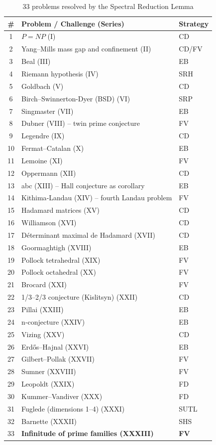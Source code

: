 \documentclass[11pt,a4paper]{article}
\begin{document}
\begin{center}
\small
\begin{longtable}{@{}cll@{}}
\caption{33 problems resolved by the Spectral Reduction Lemma}\\
\toprule
\# & Problem / Challenge (Series) & Strategy \\
\midrule
1 & \(P = NP\) (I) & CD \\
2 & Yang–Mills mass gap and confinement (II) & CD/FV \\
3 & Beal (III) & EB \\
4 & Riemann hypothesis (IV) & SRH \\
5 & Goldbach (V) & CD \\
6 & Birch–Swinnerton-Dyer (BSD) (VI) & SRP \\
7 & Singmaster (VII) & EB \\
8 & Dubner (VIII) – twin prime conjecture & FV \\
9 & Legendre (IX) & CD \\
10 & Fermat–Catalan (X) & EB \\
11 & Lemoine (XI) & FV \\
12 & Oppermann (XII) & CD \\
13 & abc (XIII) – Hall conjecture as corollary & EB \\
14 & Kithima‑Landau (XIV) – fourth Landau problem & FV \\
15 & Hadamard matrices (XV) & CD \\
16 & Williamson (XVI) & CD \\
17 & Déterminant maximal de Hadamard (XVII) & CD \\
18 & Goormaghtigh (XVIII) & EB \\
19 & Pollock tetrahedral (XIX) & FV \\
20 & Pollock octahedral (XX) & FV \\
21 & Brocard (XXI) & FV \\
22 & 1/3–2/3 conjecture (Kislitsyn) (XXII) & CD \\
23 & Pillai (XXIII) & EB \\
24 & n‑conjecture (XXIV) & EB \\
25 & Vizing (XXV) & CD \\
26 & Erdős–Hajnal (XXVI) & EB \\
27 & Gilbert–Pollak (XXVII) & FV \\
28 & Sumner (XXVIII) & FV \\
29 & Leopoldt (XXIX) & FD \\
30 & Kummer–Vandiver (XXX) & FD \\
31 & Fuglede (dimensions 1–4) (XXXI) & SUTL \\
32 & Barnette (XXXII) & SHS \\
33 & \textbf{Infinitude of prime families (XXXIII)} & \textbf{FV} \\
\bottomrule
\end{longtable}
\end{center}
\end{document}
